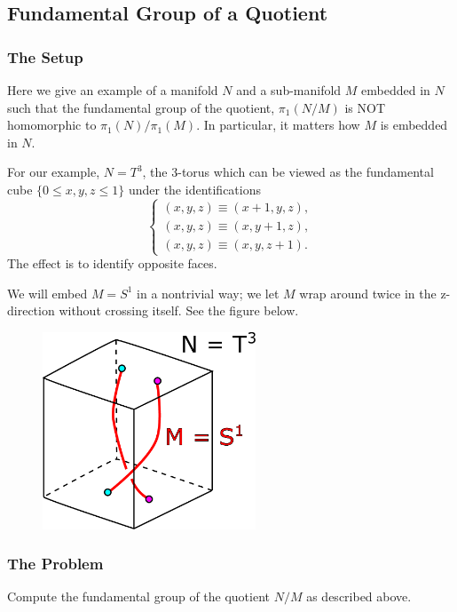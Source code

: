 \subsection{Fundamental Group of a Quotient}

\subsubsection*{The Setup}

Here we give an example of a manifold \(N\) and a sub-manifold \(M\) embedded in \(N\) such that
the fundamental group of the quotient, \(\pi_1(N / M)\) is NOT homomorphic to \(\pi_1(N) / \pi_1(M)\).
In particular, it matters how \(M\) is embedded in \(N\). 

For our example, \(N = T^3\), the 3-torus which can be viewed as the fundamental cube \(\{0 \leq x, y, z\leq 1\}\)
under the identifications
\begin{equation}
\begin{cases}
(x, y, z) \equiv (x + 1, y, z), \\
(x, y, z) \equiv (x, y + 1, z), \\
(x, y, z) \equiv (x, y, z + 1).
\end{cases}
\end{equation} 
The effect is to identify opposite faces.

We will embed \(M = S^1\) in a nontrivial way; we let \(M\) wrap around twice in the z-direction without crossing
itself. See the figure below.
\begin{figure}[h]
\centering
\includegraphics[width=2.5in]{Topology/FundamentalGroupQuotient/embedding.pdf}
\end{figure} 

\subsubsection*{The Problem}

Compute the fundamental group of the quotient \(N / M\) as described above.

